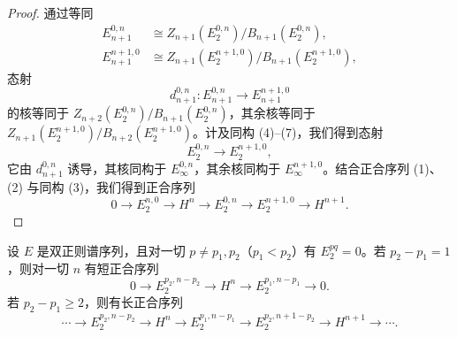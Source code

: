 \begin{proof}
通过等同
\[
\begin{aligned}
E_{n+1}^{0,n}&\cong Z_{n+1}(E_2^{0,n})/B_{n+1}(E_2^{0,n}),\\
E_{n+1}^{n+1,0}&\cong Z_{n+1}(E_2^{n+1,0})/B_{n+1}(E_2^{n+1,0}),
\end{aligned}
\]
态射
\[
d_{n+1}^{0,n}\colon E_{n+1}^{0,n}\to E_{n+1}^{n+1,0}
\]
的核等同于 $Z_{n+2}(E_2^{0,n})/B_{n+1}(E_2^{0,n})$，其余核等同于 $Z_{n+1}(E_2^{n+1,0})/B_{n+2}(E_2^{n+1,0})$。计及同构 (4)–(7)，我们得到态射
\[
E_2^{0,n}\to E_2^{n+1,0},
\]
它由 $d_{n+1}^{0,n}$ 诱导，其核同构于 $E_\infty^{0,n}$，其余核同构于 $E_\infty^{n+1,0}$。结合正合序列 (1)、(2) 与同构 (3)，我们得到正合序列
\[
0\to E_2^{n,0}\to H^n\to E_2^{0,n}\to E_2^{n+1,0}\to H^{n+1}.
\]
\end{proof}

\begin{proposition}\label{it:2.2.4}
设 $E$ 是双正则谱序列，且对一切 $p\ne p_1,p_2$（$p_1<p_2$）有 $E_2^{pq}=0$。若 $p_2-p_1=1$，则对一切 $n$ 有短正合序列
\[
0\to E_2^{p_2,n-p_2}\to H^n\to E_2^{p_1,n-p_1}\to 0.
\]
若 $p_2-p_1\ge 2$，则有长正合序列
\[
\cdots\to E_2^{p_2,n-p_2}\to H^n\to E_2^{p_1,n-p_1}\to E_2^{p_2,n+1-p_2}\to H^{n+1}\to\cdots.
\]
\end{proposition}
